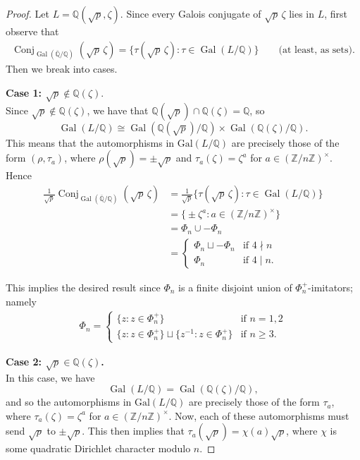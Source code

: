 \documentclass[11pt,letterpaper,reqno]{amsart}
\theoremstyle{definition}
\numberwithin{equation}{section}
\numberwithin{figure}{section}
\numberwithin{table}{section}
\newcommand{\ZZ}{\mathbb{Z}}
\newcommand{\QQ}{\mathbb{Q}}
\begin{document}
\begin{proof}
Let $L=\QQ(\sqrt p,\zeta)$. Since every Galois conjugate of $\sqrt p\,\zeta$ lies in $L$, first observe that
\begin{align}
    \operatorname{Conj}_{\operatorname{Gal}(\overline{\QQ}/\QQ)}(\sqrt p\,\zeta)=\big\{\tau(\sqrt p\,\zeta):\tau\in\operatorname{Gal}(L/\QQ)\big\} \qquad \text{(at least, as sets)}.
\end{align} 
Then we break into cases.

{\bf Case 1: $\sqrt p \notin \QQ(\zeta)$}. \\ 
Since $\sqrt p\notin\QQ(\zeta)$, we have that $\QQ(\sqrt p)\cap\QQ(\zeta)=\QQ$, so 
\[
\operatorname{Gal}(L/\QQ)\cong\operatorname{Gal}(\QQ(\sqrt p)/\QQ)\times\operatorname{Gal}(\QQ(\zeta)/\QQ).
\] 
This means that the automorphisms in $\mathrm{Gal}(L/\QQ)$ are precisely those of the form $(\rho,\tau_a)$, where
$\rho(\sqrt p)=\pm\sqrt p$ and 
$\tau_a(\zeta)=\zeta^a$ for $a\in(\ZZ/n\ZZ)^\times$. 
Hence
\begin{align}
    \frac{1}{\sqrt p} \operatorname{Conj}_{\operatorname{Gal}(\overline{\QQ}/\QQ)}(\sqrt p\,\zeta)
    &= \frac{1}{\sqrt p} \Big\{\tau(\sqrt p\,\zeta):\tau\in\operatorname{Gal}(L/\QQ)\Big\} \\
    &= \Big\{ \pm \zeta^a : a\in(\ZZ/n\ZZ)^\times \Big\} \\
    &= \Phi_n \cup -\Phi_n \\
    &= 
    \begin{cases}
        \Phi_n \sqcup -\Phi_n & \text{if } 4 \nmid n \\
        \Phi_n & \text{if } 4 \mid n.
    \end{cases}
\end{align}

This implies the desired result since $\Phi_n$ is a finite disjoint union of $\Phi_n^+$-imitators; namely
\begin{align}
    \Phi_n = 
    \begin{cases}
        \{ z : z \in \Phi_n^+\} 
        & \text{if } n=1,2 \\
        \{z : z \in\Phi_n^+\}\sqcup\{z^{-1} : z \in \Phi_n^+\}
        & \text{if } n \ge 3.
    \end{cases} 
\end{align}


\textbf{Case 2: $\sqrt p \in \QQ(\zeta)$.}\\ 
In this case, we have
\[
\operatorname{Gal}(L/\QQ)
=
\operatorname{Gal}(\QQ(\zeta)/\QQ),
\] 
and so the automorphisms in $\mathrm{Gal}(L/\QQ)$ are precisely those of the form $\tau_a$, where
$\tau_a(\zeta)=\zeta^a$ for $a\in(\ZZ/n\ZZ)^\times$. Now, each of these automorphisms must send $\sqrt p$ to $\pm\sqrt p$. This then implies that 
$\tau_a(\sqrt p)=\chi(a)\sqrt p$, where $\chi$ is some quadratic Dirichlet character modulo $n$.



\end{proof}
\end{document}
